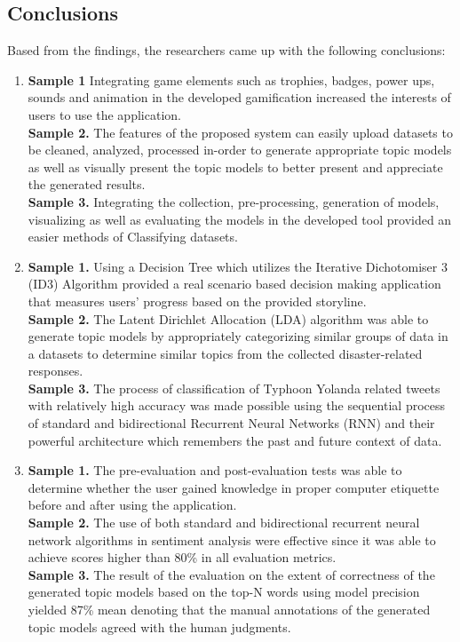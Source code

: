 \vspace{-2ex}

\subsection{ Conclusions}
\vspace{-2ex}Based from the findings, the researchers came up with the following conclusions:
\vspace{-2ex}
\begin{enumerate}
	\item \textbf{Sample 1} Integrating game elements such as trophies, badges, power ups, sounds and animation in the developed gamification increased the interests of users to use the application. \\
	\textbf{Sample 2.} The features of the proposed system can easily upload datasets to be cleaned, analyzed, processed in-order to generate appropriate topic models as well as visually present the topic models to better present and appreciate the generated results.\\
	\textbf{Sample 3.} Integrating the collection, pre-processing, generation of models, visualizing as well as evaluating the models in the developed tool provided an easier methods of Classifying datasets.
	
	\item \textbf{Sample 1.} Using a Decision Tree which utilizes the Iterative Dichotomiser 3 (ID3) Algorithm provided a real scenario based decision making application that measures users’ progress based on the provided storyline. \\
	\textbf{Sample 2.} The Latent Dirichlet Allocation (LDA) algorithm was able to generate topic models by appropriately categorizing similar groups of data in a datasets to determine similar topics from the collected disaster-related responses.\\
	\textbf{Sample 3.} The process of classification of Typhoon Yolanda related tweets with relatively high accuracy was made possible using the sequential process of standard and bidirectional Recurrent Neural Networks (RNN) and their powerful architecture which remembers the past and future context of data.
	
	\item \textbf{Sample 1.} The pre-evaluation and post-evaluation tests was able to determine whether the user gained knowledge in proper computer etiquette before and after using the application.\\
	\textbf{Sample 2.} The use of both standard and bidirectional recurrent neural network algorithms in sentiment analysis were effective since it was able to achieve scores higher than 80\% in all evaluation metrics.\\
	\textbf{Sample 3.} The result of the evaluation on the extent of correctness of the generated topic models based on the top-N words using model precision yielded 87\% mean denoting that the manual annotations of the generated topic models agreed with the human judgments.
	
\end{enumerate}

